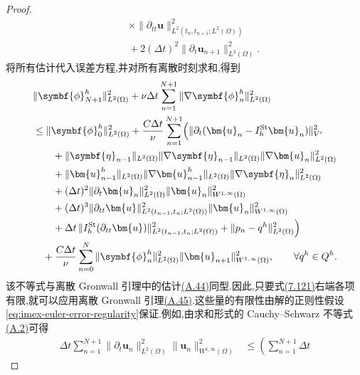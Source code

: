 \begin{proof}
\[\begin{aligned}
 &\quad\times\|\partial_{tt}\bm{u}\|_{L^2(t_n,t_{n+1};L^2(\Omega))}^2\\
 &\quad+2(\Delta t)^2\|\partial_t\bm{u}_{n+1}\|_{L^2(\Omega)}^2.
\end{aligned}
\]
将所有估计代入误差方程,并对所有离散时刻求和,得到
\begin{equation}\label{eq:imex-euler-error-energy-estimate}
\begin{aligned}
 &\|\symbf{\phi}_{N+1}^h\|_{L^2(\Omega)}^2
   +\nu\Delta t\sum_{n=1}^{N+1}
      \|\nabla\symbf{\phi}_n^h\|_{L^2(\Omega)}^2\\
 &\le \|\symbf{\phi}_0^h\|_{L^2(\Omega)}^2
   +\frac{C\Delta t}{\nu}\sum_{n=1}^{N+1}\Bigl(
      \|\partial_t(\bm{u}_n-I_h^{\mathrm{St}}\bm{u}_n)\|_{V'}^2\\
 &\qquad+\|\symbf{\eta}_{n-1}\|_{L^2(\Omega)}
      \|\nabla\symbf{\eta}_{n-1}\|_{L^2(\Omega)}
      \|\nabla\bm{u}_n\|_{L^2(\Omega)}^2\\
 &\qquad+\|\bm{u}_{n-1}^h\|_{L^2(\Omega)}
      \|\nabla\bm{u}_{n-1}^h\|_{L^2(\Omega)}
      \|\nabla\symbf{\eta}_n\|_{L^2(\Omega)}^2\\
 &\qquad+(\Delta t)^2\|\partial_t\bm{u}_n\|_{L^2(\Omega)}^2
      \|\bm{u}_n\|_{W^{1,\infty}(\Omega)}^2\\
 &\qquad+(\Delta t)^3
      \|\partial_{tt}\bm{u}\|_{L^2(t_{n-1},t_n;L^2(\Omega))}^2
      \|\bm{u}_n\|_{W^{1,\infty}(\Omega)}^2\\
 &\qquad+\Delta t\,
      \|I_h^{\mathrm{St}}(\partial_{tt}\bm{u})\|_
        {L^2(t_{n-1},t_n;L^2(\Omega))}^2
      +\|p_n-q^h\|_{L^2(\Omega)}^2\Bigr)\\
 &\quad+\frac{C\Delta t}{\nu}\sum_{n=0}^{N}
      \|\symbf{\phi}_n^h\|_{L^2(\Omega)}^2
      \|\bm{u}_{n+1}\|_{W^{1,\infty}(\Omega)}^2,
 \qquad \forall q^h\in Q^h.
\end{aligned}
\end{equation}
该不等式与离散 Gronwall 引理中的估计\hyperref[eq:appendix-a-44]{(A.44)}同型.因此,只要式\hyperref[eq:imex-euler-error-energy-estimate]{(7.121)}右端各项有限,就可以应用离散 Gronwall 引理\hyperref[lem:appendix-a-45]{(A.45)}.这些量的有限性由解的正则性假设\cref{eq:imex-euler-error-regularity}保证.例如,由求和形式的 Cauchy--Schwarz 不等式\hyperref[eq:appendix-a-2]{(A.2)}可得
\begin{equation}\label{eq:imex-euler-error-temporal-spatial-product}
\begin{aligned}
 \Delta t\sum_{n=1}^{N+1}
   \|\partial_t\bm{u}_n\|_{L^2(\Omega)}^2
   \|\bm{u}_n\|_{W^{1,\infty}(\Omega)}^2
 &\le
   \left(\sum_{n=1}^{N+1}\Delta t

\end{aligned}
\end{equation}
\end{proof}

